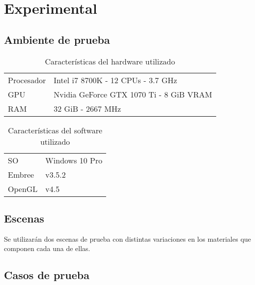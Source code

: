 \chapter{Experimental}
\label{ch:chap05}

\section{Ambiente de prueba}
\label{sec:hardware}

\begin{table}[H]
	\begin{tabular}{ll}
		Procesador & Intel i7 8700K - 12 CPUs - 3.7 GHz       \\\cline{1-1}
		GPU        & Nvidia GeForce GTX 1070 Ti - 8 GiB  VRAM \\\cline{1-1}
		RAM        & 32 GiB - 2667 MHz                        \\\cline{1-1}
	\end{tabular}
	\caption{Características del hardware utilizado}
\end{table}

\begin{table}[H]
	\begin{tabular}{ll}
		SO & Windows 10 Pro       \\\cline{1-1}
		Embree        & v3.5.2  \\\cline{1-1}
		OpenGL        & v4.5                        \\\cline{1-1}
	\end{tabular}
	\caption{Características del software utilizado}
\end{table}


\section{Escenas}
\label{sec:escenas}

Se utilizarán dos escenas de prueba con distintas variaciones en los materiales que componen cada una de ellas.



\section{Casos de prueba}
\label{sec:pruebas}
